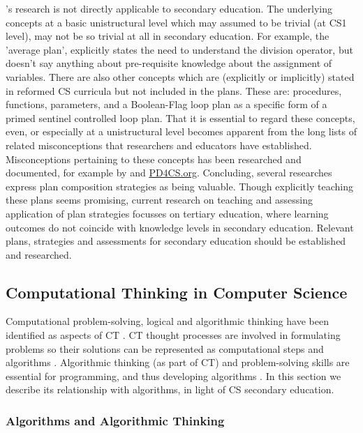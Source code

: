 \citeauthor{deRaadt2009teachingPlans}'s research is not directly applicable to secondary education. The underlying concepts at a basic unistructural level which may assumed to be trivial (at CS1 level), may not be so trivial at all in secondary education. For example, the 'average plan', explicitly states the need to understand the division operator, but doesn't say anything about pre-requisite knowledge about the assignment of variables. There are also other concepts which are (explicitly or implicitly) stated in reformed CS curricula but not included in the plans. These are: procedures, functions, parameters, and a Boolean-Flag loop plan as a specific form of a primed sentinel controlled loop plan. That it is essential to regard these concepts, even, or especially at a unistructural level becomes apparent from the long lists of related misconceptions that researchers and educators have established. Misconceptions pertaining to these concepts has been researched and documented, for example by \citeauthor{sorva2012misconceptions} and \url{PD4CS.org}.
Concluding, several researches express plan composition strategies as being valuable. Though explicitly teaching these plans seems promising, current research on teaching and assessing application of plan strategies focusses on tertiary education, where learning outcomes do not coincide with knowledge levels in secondary education. Relevant plans, strategies and assessments for secondary education should be established and researched.


\subsection{Computational Thinking in Computer Science}\label{sec:CTinCS} %
Computational problem-solving, logical and algorithmic thinking have been identified as aspects of CT \cite{grover2017measuring}. CT thought processes are involved in formulating problems so their solutions can be represented as computational steps and algorithms \cite{aho2012computation}. Algorithmic thinking (as part of CT) and problem-solving skills are essential for programming, and thus developing algorithms \cite{McCracken2001}. In this section we describe its relationship with algorithms, in light of CS secondary education.



\subsubsection{Algorithms and Algorithmic Thinking}\label{sec:AlgThinking}

